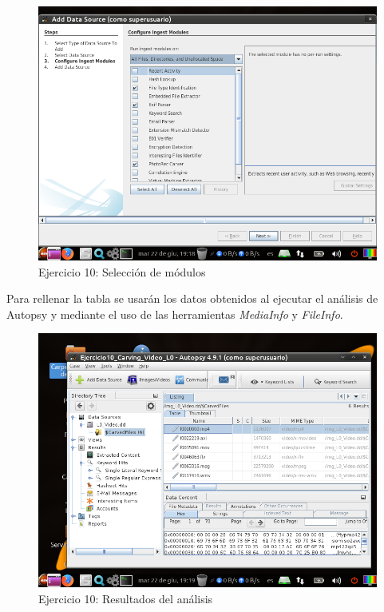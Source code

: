 \documentclass[11pt]{article}
\begin{document}
\begin{figure}[H]
    \caption{Ejercicio 10: Selección de módulos}
    \centering
    \includegraphics[scale=0.7]{e10-4.png}
\end{figure}

Para rellenar la tabla se usarán los datos obtenidos al ejecutar el análisis de Autopsy y mediante el uso de las herramientas \textit{MediaInfo} y \textit{FileInfo}.

\begin{figure}[H]
    \caption{Ejercicio 10: Resultados del análisis}
    \centering
    \includegraphics[scale=0.7]{e10-5.png}
\end{figure}
\end{document}
